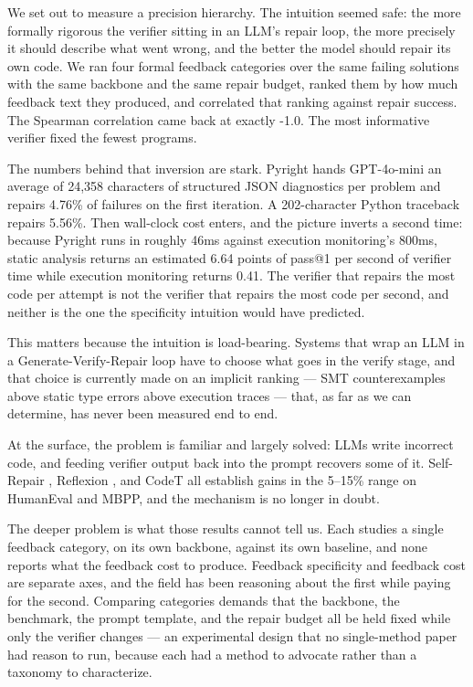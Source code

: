 
We set out to measure a precision hierarchy. The intuition seemed safe: the more formally rigorous the verifier sitting in an LLM's repair loop, the more precisely it should describe what went wrong, and the better the model should repair its own code. We ran four formal feedback categories over the same failing solutions with the same backbone and the same repair budget, ranked them by how much feedback text they produced, and correlated that ranking against repair success. The Spearman correlation came back at exactly -1.0. The most informative verifier fixed the fewest programs.

The numbers behind that inversion are stark. Pyright hands GPT-4o-mini an average of 24,358 characters of structured JSON diagnostics per problem and repairs 4.76\% of failures on the first iteration. A 202-character Python traceback repairs 5.56\%. Then wall-clock cost enters, and the picture inverts a second time: because Pyright runs in roughly 46ms against execution monitoring's 800ms, static analysis returns an estimated 6.64 points of pass@1 per second of verifier time while execution monitoring returns 0.41. The verifier that repairs the most code per attempt is not the verifier that repairs the most code per second, and neither is the one the specificity intuition would have predicted.

This matters because the intuition is load-bearing. Systems that wrap an LLM in a Generate-Verify-Repair loop have to choose what goes in the verify stage, and that choice is currently made on an implicit ranking --- SMT counterexamples above static type errors above execution traces --- that, as far as we can determine, has never been measured end to end.

At the surface, the problem is familiar and largely solved: LLMs write incorrect code, and feeding verifier output back into the prompt recovers some of it. Self-Repair \citep{Olausson2023SelfRepair}, Reflexion \citep{Shinn2023Reflexion}, and CodeT \citep{Chen2022CodeT} all establish gains in the 5--15\% range on HumanEval and MBPP, and the mechanism is no longer in doubt.

The deeper problem is what those results cannot tell us. Each studies a single feedback category, on its own backbone, against its own baseline, and none reports what the feedback cost to produce. Feedback specificity and feedback cost are separate axes, and the field has been reasoning about the first while paying for the second. Comparing categories demands that the backbone, the benchmark, the prompt template, and the repair budget all be held fixed while only the verifier changes --- an experimental design that no single-method paper had reason to run, because each had a method to advocate rather than a taxonomy to characterize.

